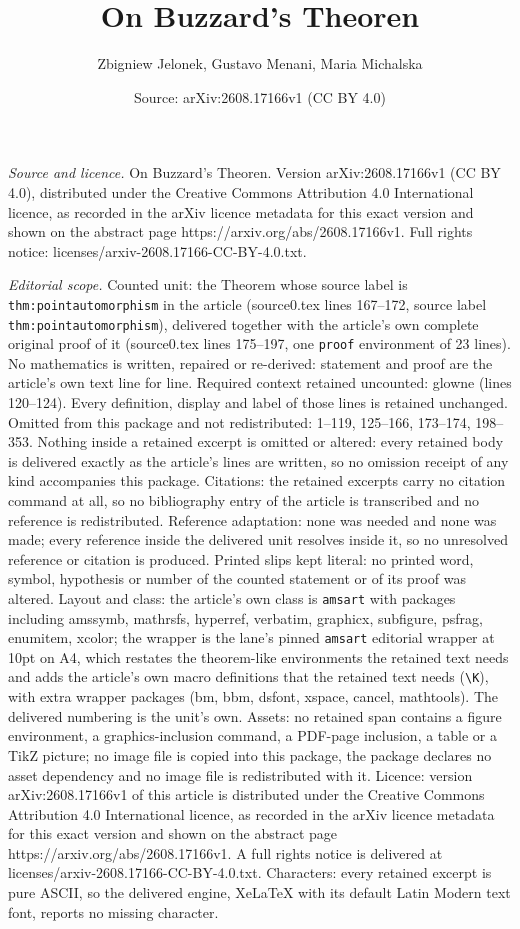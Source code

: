 \documentclass[10pt,a4paper]{amsart}
\title[On Buzzard's Theoren]{On Buzzard's Theoren}
\author{Zbigniew Jelonek, Gustavo Menani, Maria Michalska}
\date{Source: arXiv:2608.17166v1 (CC BY 4.0)}
\begin{document}
\maketitle

\noindent\emph{Source and licence.} On Buzzard's Theoren. Version arXiv:2608.17166v1 (CC BY 4.0), distributed under the Creative Commons Attribution 4.0 International licence, as recorded in the arXiv licence metadata for this exact version and shown on the abstract page https://arxiv.org/abs/2608.17166v1. Full rights notice: licenses/arxiv-2608.17166-CC-BY-4.0.txt.\par\smallskip

\noindent\textit{Editorial scope.} Counted unit: the Theorem whose source label is \texttt{thm:pointautomorphism} in the article (source0.tex lines 167--172, source label \texttt{thm:pointautomorphism}), delivered together with the article's own complete original proof of it (source0.tex lines 175--197, one \texttt{proof} environment of 23 lines). No mathematics is written, repaired or re-derived: statement and proof are the article's own text line for line. Required context retained uncounted: glowne (lines 120--124). Every definition, display and label of those lines is retained unchanged. Omitted from this package and not redistributed: 1--119, 125--166, 173--174, 198--353. Nothing inside a retained excerpt is omitted or altered: every retained body is delivered exactly as the article's lines are written, so no omission receipt of any kind accompanies this package. Citations: the retained excerpts carry no citation command at all, so no bibliography entry of the article is transcribed and no reference is redistributed. Reference adaptation: none was needed and none was made; every reference inside the delivered unit resolves inside it, so no unresolved reference or citation is produced. Printed slips kept literal: no printed word, symbol, hypothesis or number of the counted statement or of its proof was altered. Layout and class: the article's own class is \texttt{amsart} with packages including amssymb, mathrsfs, hyperref, verbatim, graphicx, subfigure, psfrag, enumitem, xcolor; the wrapper is the lane's pinned \texttt{amsart} editorial wrapper at 10pt on A4, which restates the theorem-like environments the retained text needs and adds the article's own macro definitions that the retained text needs (\texttt{\textbackslash K}), with extra wrapper packages (bm, bbm, dsfont, xspace, cancel, mathtools). The delivered numbering is the unit's own. Assets: no retained span contains a figure environment, a graphics-inclusion command, a PDF-page inclusion, a table or a TikZ picture; no image file is copied into this package, the package declares no asset dependency and no image file is redistributed with it. Licence: version arXiv:2608.17166v1 of this article is distributed under the Creative Commons Attribution 4.0 International licence, as recorded in the arXiv licence metadata for this exact version and shown on the abstract page https://arxiv.org/abs/2608.17166v1. A full rights notice is delivered at licenses/arxiv-2608.17166-CC-BY-4.0.txt. Characters: every retained excerpt is pure ASCII, so the delivered engine, XeLaTeX with its default Latin Modern text font, reports no missing character.
\end{document}
